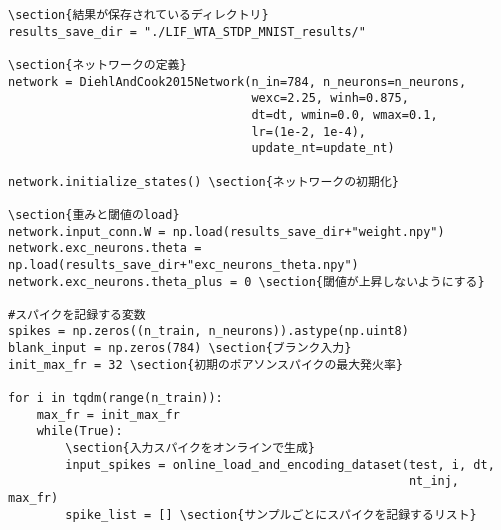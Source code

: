\begin{verbatim}
\section{結果が保存されているディレクトリ}
results_save_dir = "./LIF_WTA_STDP_MNIST_results/"

\section{ネットワークの定義}
network = DiehlAndCook2015Network(n_in=784, n_neurons=n_neurons,
                                  wexc=2.25, winh=0.875,
                                  dt=dt, wmin=0.0, wmax=0.1,
                                  lr=(1e-2, 1e-4),
                                  update_nt=update_nt)

network.initialize_states() \section{ネットワークの初期化}

\section{重みと閾値のload}
network.input_conn.W = np.load(results_save_dir+"weight.npy")
network.exc_neurons.theta = np.load(results_save_dir+"exc_neurons_theta.npy")
network.exc_neurons.theta_plus = 0 \section{閾値が上昇しないようにする}

#スパイクを記録する変数
spikes = np.zeros((n_train, n_neurons)).astype(np.uint8)
blank_input = np.zeros(784) \section{ブランク入力}
init_max_fr = 32 \section{初期のポアソンスパイクの最大発火率}

for i in tqdm(range(n_train)):
    max_fr = init_max_fr
    while(True):
        \section{入力スパイクをオンラインで生成}
        input_spikes = online_load_and_encoding_dataset(test, i, dt,
                                                        nt_inj, max_fr)
        spike_list = [] \section{サンプルごとにスパイクを記録するリスト}

\end{verbatim}
